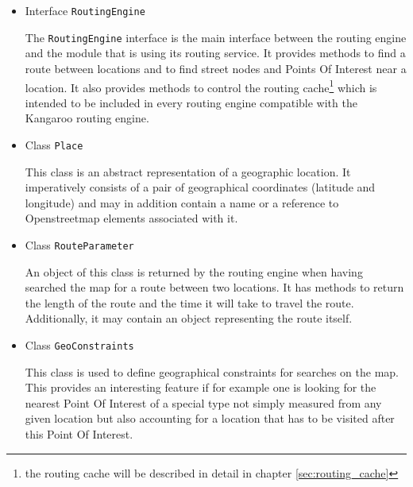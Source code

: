 \begin{itemize}

	\item Interface \texttt{RoutingEngine}
	
		The \texttt{RoutingEngine} interface is the main interface between the routing engine and the module that is using its routing service. It provides methods to find a route between locations and to find street nodes and Points Of Interest near a location. It also provides methods to control the routing cache\footnote{the routing cache will be described in detail in chapter \ref{sec:routing_cache}} which is intended to be included in every routing engine compatible with the Kangaroo routing engine.
		
	\item Class \texttt{Place}
	
		This class is an abstract representation of a geographic location. It imperatively consists of a pair of geographical coordinates (latitude and longitude) and may in addition contain a name or a reference to Openstreetmap elements associated with it.
	
	\item Class \texttt{RouteParameter}
	
		An object of this class is returned by the routing engine when having searched the map for a route between two locations. It has methods to return the length of the route and the time it will take to travel the route. Additionally, it may contain an object representing the route itself.	
	
	\item Class \texttt{GeoConstraints}
	
		This class is used to define geographical constraints for searches on the map. This provides an interesting feature if for example one is looking for the nearest Point Of Interest of a special type not simply measured from any given location but also accounting for a location that has to be visited after this Point Of Interest.

\end{itemize}

